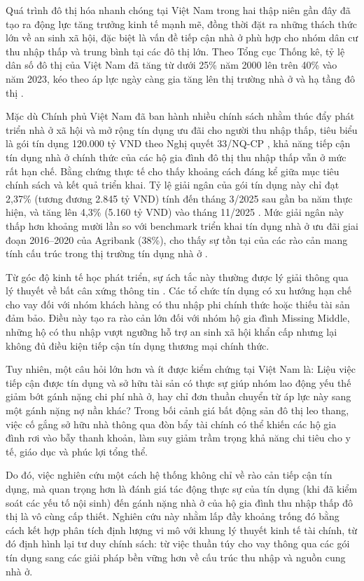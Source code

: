 \documentclass[12pt,a4paper]{report}
\begin{document}
	Quá trình đô thị hóa nhanh chóng tại Việt Nam trong hai thập niên gần đây đã tạo ra động lực tăng trưởng kinh tế mạnh mẽ, đồng thời đặt ra những thách thức lớn về an sinh xã hội, đặc biệt là vấn đề tiếp cận nhà ở phù hợp cho nhóm dân cư thu nhập thấp và trung bình tại các đô thị lớn. Theo Tổng cục Thống kê, tỷ lệ dân số đô thị của Việt Nam đã tăng từ dưới 25\% năm 2000 lên trên 40\% vào năm 2023, kéo theo áp lực ngày càng gia tăng lên thị trường nhà ở và hạ tầng đô thị \parencite{VietnamGSO2023}.
	
	Mặc dù Chính phủ Việt Nam đã ban hành nhiều chính sách nhằm thúc đẩy phát triển nhà ở xã hội và mở rộng tín dụng ưu đãi cho người thu nhập thấp, tiêu biểu là gói tín dụng 120.000 tỷ VND theo Nghị quyết 33/NQ-CP \textcite{NQ33CP2022}, khả năng tiếp cận tín dụng nhà ở chính thức của các hộ gia đình đô thị thu nhập thấp vẫn ở mức rất hạn chế. Bằng chứng thực tế cho thấy khoảng cách đáng kể giữa mục tiêu chính sách và kết quả triển khai. Tỷ lệ giải ngân của gói tín dụng này chỉ đạt 2,37\% (tương đương 2.845 tỷ VND) tính đến tháng 3/2025 sau gần ba năm thực hiện, và tăng lên 4,3\% (5.160 tỷ VND) vào tháng 11/2025 \parencite{CafeLand2025,CafeF2025}. Mức giải ngân này thấp hơn khoảng mười lần so với benchmark triển khai tín dụng nhà ở ưu đãi giai đoạn 2016–2020 của Agribank (38\%), cho thấy sự tồn tại của các rào cản mang tính cấu trúc trong thị trường tín dụng nhà ở \parencite{SBV2025}. 
	
	Từ góc độ kinh tế học phát triển, sự ách tắc này thường được lý giải thông qua lý thuyết về bất cân xứng thông tin \parencite{Stiglitz1981}. Các tổ chức tín dụng có xu hướng hạn chế cho vay đối với nhóm khách hàng có thu nhập phi chính thức hoặc thiếu tài sản đảm bảo. Điều này tạo ra rào cản lớn đối với nhóm hộ gia đình Missing Middle, những hộ có thu nhập vượt ngưỡng hỗ trợ an sinh xã hội khẩn cấp nhưng lại không đủ điều kiện tiếp cận tín dụng thương mại chính thức.
	
	Tuy nhiên, một câu hỏi lớn hơn và ít được kiểm chứng tại Việt Nam là: Liệu việc tiếp cận được tín dụng và sở hữu tài sản có thực sự giúp nhóm lao động yếu thế giảm bớt gánh nặng chi phí nhà ở, hay chỉ đơn thuần chuyển từ áp lực này sang một gánh nặng nợ nần khác? Trong bối cảnh giá bất động sản đô thị leo thang, việc cố gắng sở hữu nhà thông qua đòn bẩy tài chính có thể khiến các hộ gia đình rơi vào bẫy thanh khoản, làm suy giảm trầm trọng khả năng chi tiêu cho y tế, giáo dục và phúc lợi tổng thể.
	
	Do đó, việc nghiên cứu một cách hệ thống không chỉ về rào cản tiếp cận tín dụng, mà quan trọng hơn là đánh giá tác động thực sự của tín dụng (khi đã kiểm soát các yếu tố nội sinh) đến gánh nặng nhà ở của hộ gia đình thu nhập thấp đô thị là vô cùng cấp thiết. Nghiên cứu này nhằm lấp đầy khoảng trống đó bằng cách kết hợp phân tích định lượng vi mô với khung lý thuyết kinh tế tài chính, từ đó định hình lại tư duy chính sách: từ việc thuần túy cho vay thông qua các gói tín dụng sang các giải pháp bền vững hơn về cấu trúc thu nhập và nguồn cung nhà ở.
	
\end{document}

